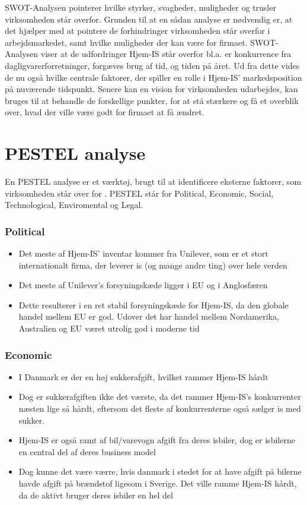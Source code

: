 SWOT-Analysen\cite{Organisation} pointerer hvilke styrker, svagheder, muligheder og trusler virksomheden står overfor. Grunden til at en sådan analyse er nødvendig er, at det hjælper med at pointere de forhindringer virksomheden står overfor i arbejdsmarkedet, samt hvilke muligheder der kan være for firmaet. SWOT-Analysen viser at de udfordringer Hjem-IS står overfor bl.a. er konkurrence fra dagligvarerforretninger, forgæves brug af tid, og tiden på året. Ud fra dette vides de nu også hvilke centrale faktorer, der spiller en rolle i Hjem-IS' markedsposition på nuværende tidspunkt.
Senere kan en vision for virksomheden udarbejdes, kan bruges til at behandle de forskellige punkter, for at stå stærkere og få et overblik over, hvad der ville være godt for firmaet at få ændret.

\section{PESTEL analyse}
En PESTEL analyse er et værktøj, brugt til at identificere eksterne faktorer, som virksomheden står over for \cite{Oxford}. PESTEL står for Political, Economic, Social, Technological, Enviromental og Legal. 
\subsubsection{Political}
\begin{itemize}
    \item Det meste af Hjem-IS’ inventar kommer fra Unilever, som er et stort internationalt firma, der leverer is (og mange andre ting) over hele verden
    \item Det meste af Unilever’s forsyningskæde ligger i EU og i Anglosfæren
    \item Dette resulterer i en ret stabil forsyningskæde for Hjem-IS, da den globale handel mellem EU er god. Udover det har handel mellem Nordamerika, Australien og EU været utrolig god i moderne tid
\end{itemize}
\subsubsection{Economic}
\begin{itemize}
    \item I Danmark er der en høj sukkerafgift\cite{Sugar}, hvilket rammer Hjem-IS hårdt
    \item Dog er sukkerafgiften ikke det værste, da det rammer Hjem-IS’s konkurrenter næsten lige så hårdt, eftersom det fleste af konkurrenterne også sælger is med sukker.
    \item Hjem-IS er også ramt af bil/varevogn afgift fra deres isbiler, dog er isbilerne en central del af deres business model
    \item Dog kunne det være værre, hvis danmark i stedet for at have afgift på bilerne havde afgift på brændstof ligesom i Sverige. Det ville ramme Hjem-IS hårdt, da de aktivt bruger deres isbiler en hel del
\end{itemize}
